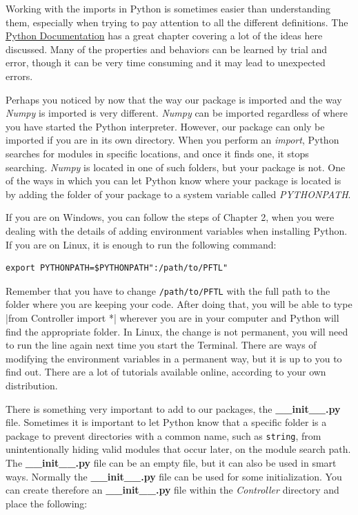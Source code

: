 
Working with the imports in Python is sometimes easier than understanding them, especially when trying to pay attention to all the different definitions. The \href{https://docs.python.org/3.6/tutorial/modules.html}{Python Documentation} has a great chapter covering a lot of the ideas here
discussed. Many of the properties and behaviors can be learned by trial and error, though it can be very time consuming and it may lead to unexpected errors.

Perhaps you noticed by now that the way our package is imported and the way \emph{Numpy} is imported is very different. \emph{Numpy} can be
imported regardless of where you have started the Python interpreter. However, our package can only be imported if you are in its own directory. When you perform an \emph{import}, Python searches for modules in specific locations, and once it finds one, it stops searching. \emph{Numpy} is located in one of such folders, but your package is not. One of the ways in which you can let Python know where your package is located is by adding the folder of your package to a system variable called \emph{PYTHONPATH}.

If you are on Windows, you can follow the steps of Chapter 2, when you were dealing with the details of adding environment variables when
installing Python. If you are on Linux, it is enough to run the following command:

\begin{verbatim}
export PYTHONPATH=$PYTHONPATH":/path/to/PFTL"
\end{verbatim}

Remember that you have to change \texttt{/path/to/PFTL} with the full path to the folder where you are keeping your code. After doing that, you will be able to type |from Controller import *| wherever you are in your computer and Python will find the appropriate folder. In Linux, the change is not permanent, you will need to run the line again next time you start the Terminal. There are ways of modifying the environment variables in a permanent way, but it is up to you to find out. There are a lot of tutorials available online, according to your own distribution. 

There is something very important to add to our packages, the
\textbf{\_\_init\_\_.py} file. Sometimes it is important to let Python
know that a specific folder is a package to prevent directories with a
common name, such as \texttt{string}, from unintentionally hiding valid
modules that occur later, on the module search path. The
\textbf{\_\_init\_\_.py} file can be an empty file, but it can also be
used in smart ways. Normally the \textbf{\_\_init\_\_.py} file can be
used for some initialization. You can create therefore an
\textbf{\_\_init\_\_.py} file within the \emph{Controller} directory and
place the following:

